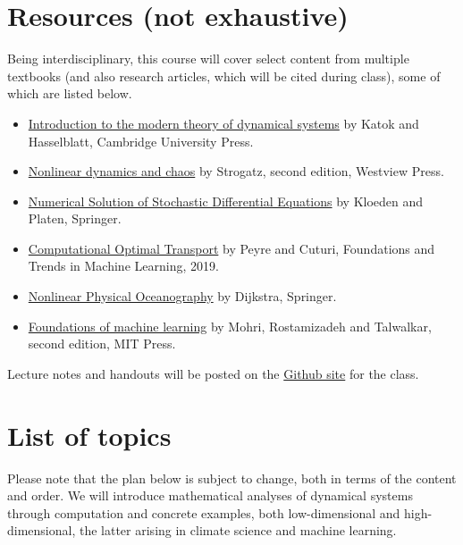 \documentclass[12pt]{article}
\begin{document}
\section{Resources (not exhaustive)}
\label{sec:resources}
Being interdisciplinary, this course will cover select content from multiple textbooks (and also research articles, which will be cited during class), some of which are listed below. 
\begin{itemize}
	\item 
		\href{https://books.google.com/books?hl=en&lr=&id=9nL7ZX8Djp4C&oi=fnd&pg=PR7&dq=katok+and+hasselblatt&ots=oWieU2cCAH&sig=T-g4-msNhCCTTpoSyMb09ZhnF2Y#v=onepage&q=katok%20and%20hasselblatt&f=false}{Introduction to the modern theory of dynamical systems} by Katok and Hasselblatt, Cambridge University Press.
	\item  \href{https://books.google.com/books?hl=en&lr=&id=wUBvDwAAQBAJ&oi=fnd&pg=PT7&ots=AOtaTsiIyX&sig=MexxyAiFbXhsxZNKq6V7YLjjv5w#v=onepage&q&f=false}{Nonlinear dynamics and chaos} by Strogatz, second edition, Westview Press.
	\item \href{https://link.springer.com/book/10.1007/978-3-662-12616-5}{Numerical Solution of Stochastic Differential Equations} by Kloeden and Platen, Springer. 

	\item \href{https://www.nowpublishers.com/article/Details/MAL-073}{Computational Optimal Transport} by Peyre and Cuturi, Foundations and Trends in Machine Learning, 2019.
	\item \href{https://books.google.com/books?hl=en&lr=&id=vaFKLXvfSaUC&oi=fnd&pg=PR9&dq=henk+dijkstra&ots=DCHHbStuIf&sig=ibiNU5CqYdT-Fo37v1FUIpuLs1o#v=onepage&q=henk%20dijkstra&f=false}{Nonlinear Physical Oceanography} by Dijkstra, Springer.	
	\item \href{https://books.google.com/books?hl=en&lr=&id=dWB9DwAAQBAJ&oi=fnd&pg=PR5&dq=foundations+of+machine+learning+mohri&ots=AznTXOq_s4&sig=oFBecq2rS2nusMY-xRj1qD-0Dsk#v=onepage&q=foundations%20of%20machine%20learning%20mohri&f=false}{Foundations of machine learning} by Mohri, Rostamizadeh and Talwalkar, second edition, MIT Press. 
	
\end{itemize}
Lecture notes and handouts will be posted on the \href{https://github.com/ni-sha-c/ComputationalDynamics-Spring24}{Github site} for the class.

\section{List of topics}
\label{sec:topics}
Please note that the plan below is subject to change, both in terms of the content and order. We will introduce mathematical analyses of dynamical systems through computation and concrete examples, both low-dimensional and high-dimensional, the latter arising in climate science and machine learning. 
\end{document}

